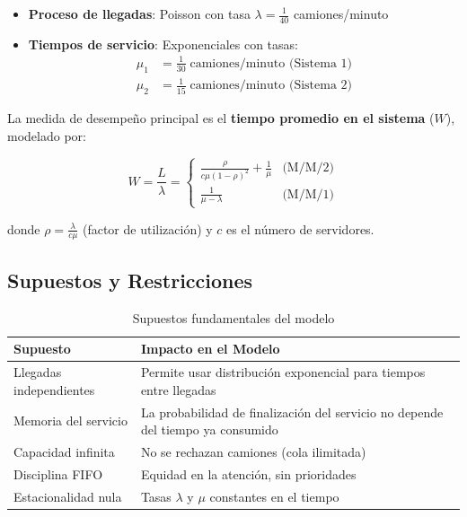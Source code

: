 \documentclass[a4paper, 12pt]{article}
\begin{document}
  \begin{itemize}
  	\item \textbf{Proceso de llegadas}: Poisson con tasa $\lambda = \frac{1}{40}$ camiones/minuto
  	\item \textbf{Tiempos de servicio}: Exponenciales con tasas:
  	\begin{align*}
  		\mu_1 &= \frac{1}{30}\;\text{camiones/minuto (Sistema 1)} \\
  		\mu_2 &= \frac{1}{15}\;\text{camiones/minuto (Sistema 2)}
  	\end{align*}
  \end{itemize}
  
  La medida de desempeño principal es el \textbf{tiempo promedio en el sistema} ($W$), modelado por:
  
  \begin{equation}
  	W = \frac{L}{\lambda} = \begin{cases}
  		\frac{\rho}{c\mu(1-\rho)^2} + \frac{1}{\mu} & \text{(M/M/2)} \\
  		\frac{1}{\mu - \lambda} & \text{(M/M/1)}
  	\end{cases}
  \end{equation}
  
  donde $\rho = \frac{\lambda}{c\mu}$ (factor de utilización) y $c$ es el número de servidores.
  
  \subsection{Supuestos y Restricciones} 
  \begin{table}[H]
  	\centering
  	\begin{tabular}{p{5cm}p{8cm}}
  		\toprule
  		\textbf{Supuesto} & \textbf{Impacto en el Modelo} \\
  		\midrule
  		Llegadas independientes & Permite usar distribución exponencial para tiempos entre llegadas \\
  		Memoria del servicio & La probabilidad de finalización del servicio no depende del tiempo ya consumido \\
  		Capacidad infinita & No se rechazan camiones (cola ilimitada) \\
  		Disciplina FIFO & Equidad en la atención, sin prioridades \\
  		Estacionalidad nula & Tasas $\lambda$ y $\mu$ constantes en el tiempo \\
  		\bottomrule
  	\end{tabular}
  	\caption{Supuestos fundamentales del modelo}
  	\label{tab:supuestos}
  \end{table}
  
\end{document}

